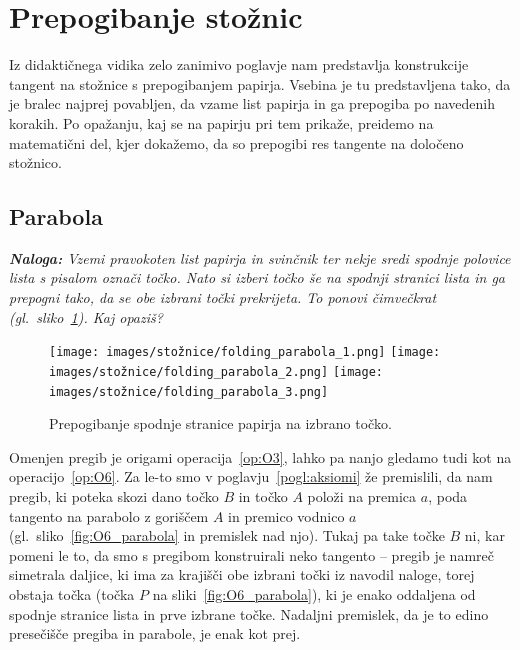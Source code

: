 \section{Prepogibanje stožnic}
\label{pogl:stoznice}


Iz didaktičnega vidika zelo zanimivo poglavje nam predstavlja konstrukcije tangent na stožnice s prepogibanjem papirja. Vsebina je tu predstavljena tako, da je bralec najprej povabljen, da vzame list papirja in ga prepogiba po navedenih korakih. Po opažanju, kaj se na papirju pri tem prikaže, preidemo na matematični del, kjer dokažemo, da so prepogibi res tangente na določeno stožnico.



\subsection{Parabola}

\textit{\textbf{Naloga:} Vzemi pravokoten list papirja in svinčnik ter nekje sredi spodnje polovice lista s pisalom označi točko. Nato si izberi točko še na spodnji stranici lista in ga prepogni tako, da se obe izbrani točki prekrijeta. To ponovi čimvečkrat (gl.\ sliko~\ref{fig:koraki_parabola}). Kaj opaziš?}

\begin{figure}[h]
    \centering
    \texttt{[image: images/stožnice/folding\_parabola\_1.png]}
    \texttt{[image: images/stožnice/folding\_parabola\_2.png]}
    \texttt{[image: images/stožnice/folding\_parabola\_3.png]}
    \caption[Prepogibanje parabole]{Prepogibanje spodnje stranice papirja na izbrano točko.}
    \label{fig:koraki_parabola}
\end{figure}

Omenjen pregib je origami operacija~\ref{op:O3}, lahko pa nanjo gledamo tudi kot na operacijo~\ref{op:O6}. Za le-to smo v poglavju~\ref{pogl:aksiomi} že premislili, da nam pregib, ki poteka skozi dano točko $B$ in točko $A$ položi na premica $a$, poda tangento na parabolo z goriščem $A$ in premico vodnico $a$ (gl.\ sliko~\ref{fig:O6_parabola} in premislek nad njo). Tukaj pa take točke $B$ ni, kar pomeni le to, da smo s pregibom konstruirali neko tangento -- pregib je namreč simetrala daljice, ki ima za krajišči obe izbrani točki iz navodil naloge, torej obstaja točka (točka $P$ na sliki~\ref{fig:O6_parabola}), ki je enako oddaljena od spodnje stranice lista in prve izbrane točke. Nadaljni premislek, da je to edino presečišče pregiba in parabole, je enak kot prej.

